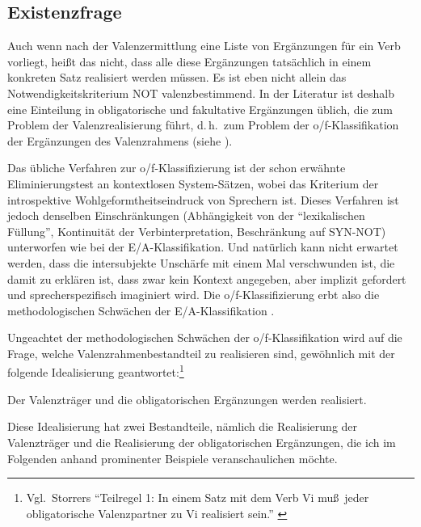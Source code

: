 \subsection{Existenzfrage} \label{sec-existenzfrage}

Auch wenn nach der Valenzermittlung eine Liste von Ergänzungen für ein Verb vorliegt, hei\ss t das nicht, dass alle diese Ergänzungen tatsächlich in einem konkreten Satz realisiert werden müssen. Es ist eben nicht allein das Notwendigkeitskriterium NOT valenzbestimmend. In der Literatur ist deshalb eine Einteilung in obligatorische und fakultative Ergänzungen üblich, die zum Problem der Valenzrealisierung führt, d.\,h.\ zum Problem der o/f-Klassifikation der Ergänzungen des Valenzrahmens (siehe \citealt[95ff]{Storrer:92}). 

Das übliche Verfahren zur o/f-Klassifizierung ist der schon erwähnte Eliminierungstest an kontextlosen System-Sätzen, wobei das Kriterium der introspektive Wohlgeformtheitseindruck von Sprechern ist. Dieses Verfahren ist jedoch denselben Einschränkungen (Abhängigkeit von der "`lexikalischen Füllung"', Kontinuität der Verb\-interpretation, Beschränkung auf SYN-NOT) unterworfen wie bei der E/A-Klassifikation. Und natürlich kann nicht erwartet werden, dass die intersubjekte Unschärfe mit einem Mal verschwunden ist, die damit zu erklären ist, dass zwar kein Kontext angegeben, aber implizit gefordert und sprecherspezifisch imaginiert wird. Die o/f-Klassifizierung erbt also die methodologischen Schwächen der E/A-Klassifikation \citep[240ff]{Storrer:92}.

Ungeachtet der methodologischen Schwächen der o/f-Klassifikation wird auf die Frage, welche Valenzrahmenbestandteil zu realisieren sind, gewöhnlich mit der folgende Idealisierung geantwortet:\footnote{Vgl.\ Storrers "`Teilregel 1: In einem Satz mit dem Verb Vi mu\ss\ jeder obligatorische Valenzpartner zu Vi realisiert sein."' \citep[110]{Storrer:92}}  

\begin{idealisierung} 
Der Valenzträger und die obligatorischen Ergänzungen werden realisiert.
\end{idealisierung} 
Diese Idealisierung hat zwei Bestandteile, nämlich die Realisierung der Valenzträger und die Realisierung der obligatorischen Ergänzungen, die ich im Folgenden anhand prominenter Beispiele veranschaulichen möchte. %

